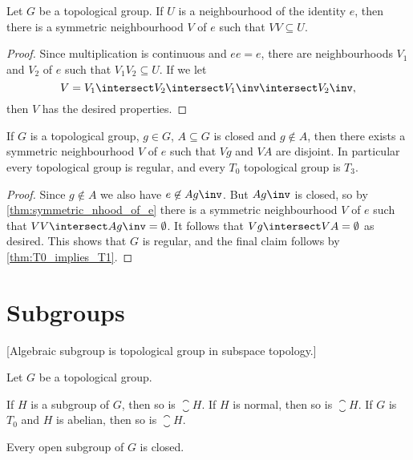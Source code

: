 \documentclass[article, a4paper, 11pt, oneside]{memoir}
\numberwithin{equation}{chapter}
\begin{document}
\begin{lemma}
    \label{thm:symmetric_nhood_of_e}
    Let $G$ be a topological group. If $U$ is a neighbourhood of the identity $e$, then there is a symmetric neighbourhood $V$ of $e$ such that $VV \subseteq U$.
\end{lemma}

\begin{proof}
    Since multiplication is continuous and $ee = e$, there are neighbourhoods $V_1$ and $V_2$ of $e$ such that $V_1 V_2 \subseteq U$. If we let
    \begin{equation*}
        V = V_1 \intersect V_2 \intersect V_1\inv \intersect V_2\inv,
    \end{equation*}
    then $V$ has the desired properties.
\end{proof}


\begin{proposition}
    \label{thm:topological_group_regular}
    If $G$ is a topological group, $g \in G$, $A \subseteq G$ is closed and $g \not\in A$, then there exists a symmetric neighbourhood $V$ of $e$ such that $Vg$ and $VA$ are disjoint. In particular every topological group is regular, and every $T_0$ topological group is $T_3$.
\end{proposition}

\begin{proof}
    Since $g \not\in A$ we also have $e \not\in Ag\inv$. But $Ag\inv$ is closed, so by \cref{thm:symmetric_nhood_of_e} there is a symmetric neighbourhood $V$ of $e$ such that $VV \intersect Ag\inv = \emptyset$. It follows that $Vg \intersect VA = \emptyset$ as desired. This shows that $G$ is regular, and the final claim follows by \cref{thm:T0_implies_T1}.
\end{proof}


\chapter{Subgroups}

[Algebraic subgroup is topological group in subspace topology.]

\begin{proposition}
    Let $G$ be a topological group.
    \begin{enumprop}
        \item \label{enum:closure_of_subgroup} If $H$ is a subgroup of $G$, then so is $\closure{H}$. If $H$ is normal, then so is $\closure{H}$. If $G$ is $T_0$ and $H$ is abelian, then so is $\closure{H}$.
        
        \item \label{enum:open_subgroup_is_closed} Every open subgroup of $G$ is closed.
    \end{enumprop}
\end{proposition}
\end{document}

